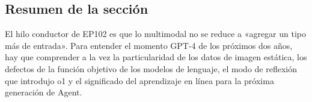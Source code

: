 \subsection{Resumen de la sección}

El hilo conductor de EP102 es que lo multimodal no se reduce a «agregar un tipo más de entrada». Para entender el momento GPT-4 de los próximos dos años, hay que comprender a la vez la particularidad de los datos de imagen estática, los defectos de la función objetivo de los modelos de lenguaje, el modo de reflexión que introdujo o1 y el significado del aprendizaje en línea para la próxima generación de Agent.
